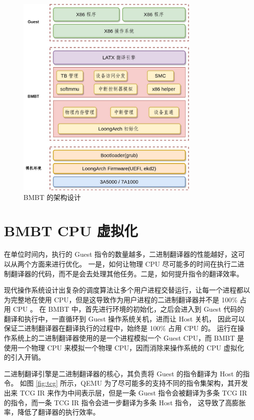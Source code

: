 \begin{figure}[!htbp]
	\centering
	\includegraphics[width=0.8\textwidth]{./images/bmbt.jpg}
	\caption{BMBT 的架构设计}
	\label{fig:bmbt_layout}
\end{figure}

\section{BMBT CPU 虚拟化}
在单位时间内，执行的 Guest 指令的数量越多，二进制翻译器的性能越好，这可以从两个方面来进行优化。
一是，如何让物理 CPU 尽可能多的时间在执行二进制翻译器的代码，而不是会去处理其他任务。二是，如何提升指令的翻译效率。

现代操作系统设计出复杂的调度算法让多个用户进程交替运行，让每一个进程都以为完整地在使用 CPU，但是这导致作为用户进程的二进制翻译器并不是 100\% 占用 CPU 。
在 BMBT 中，首先进行环境的初始化，之后会进入到 Guest 代码的翻译和执行中，一直循环到 Guest 操作系统关机，进而让 Host 关机，
因此可以保证二进制翻译器在翻译执行的过程中，始终是 100\% 占用 CPU 的。
运行在操作系统上的二进制翻译器使用的是一个进程模拟一个 Guest CPU，而 BMBT 是使用一个物理 CPU 来模拟一个物理 CPU，因而消除来操作系统的 CPU 虚拟化的引入开销。

二进制翻译引擎是二进制翻译器的核心，其负责将 Guest 的指令翻译为 Host 的指令。
如图 \ref{fig:tcg} 所示，QEMU 为了尽可能多的支持不同的指令集架构，其开发出来 TCG IR 来作为中间表示层，但是一条 Guest 指令会被翻译为多条 TCG IR 的指令，而一条 TCG IR 指令会进一步翻译为多条 Host 指令，
这导致了高膨胀率，降低了翻译器的执行效率。

